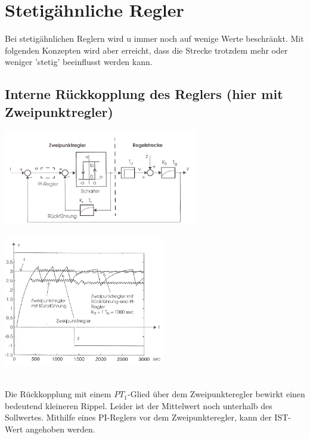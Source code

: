 \section{Stetigähnliche Regler }
Bei stetigähnlichen Reglern wird u immer noch auf wenige Werte beschränkt. Mit folgenden Konzepten wird aber erreicht, dass die Strecke trotzdem mehr oder weniger 'stetig' beeinflusst werden kann.
\subsection{Interne Rückkopplung des Reglers (hier mit Zweipunktregler) }
		\begin{minipage}{9cm}
		\includegraphics[width=8.5cm]{./bilder/ZweipunktreglerMitRueckfuehrung.jpg}
        \end{minipage}
		\begin{minipage}{7.5cm}
        \includegraphics[width=7cm]{./bilder/ZweipunktreglerMitRueckfuehrung_dia.jpg}
        \end{minipage}\\
		Die Rückkopplung mit einem $PT_1$-Glied über dem Zweipunkteregler bewirkt
		einen bedeutend kleineren Rippel. Leider ist der Mittelwert noch unterhalb des
		Sollwertes. Mithilfe eines PI-Reglers vor dem Zweipunkteregler, kann der IST-Wert
		angehoben werden.
